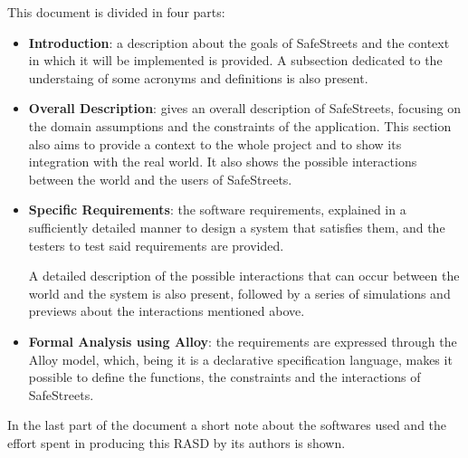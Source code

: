 This document is divided in four parts:
\begin{itemize}
	\item \textbf{Introduction}: a description about the goals of SafeStreets and the context in which it will be implemented is provided. A subsection dedicated to the understaing of some acronyms and definitions is also present. 
	
	\item \textbf{Overall Description}: gives an overall description of SafeStreets, focusing on the domain assumptions and the constraints of the application. This section also aims to provide a context to the whole project and to show its integration with the real world. It also shows the possible interactions between the world and the users of SafeStreets. 
	
	\item \textbf{Specific Requirements}: the software requirements, explained in a sufficiently detailed manner to design a system that satisfies them, and the testers to test said requirements are provided.
		
		A detailed description of the possible interactions that can occur between the world and the system is also present, followed by a series of simulations and previews about the interactions mentioned above.
	
	\item \textbf{Formal Analysis using Alloy}: the requirements are expressed through the Alloy model, which, being it is a declarative specification language, makes it possible to define the functions, the constraints and the interactions of SafeStreets.
\end{itemize}
In the last part of the document a short note about the softwares used and the effort spent in producing this RASD by its authors is shown.